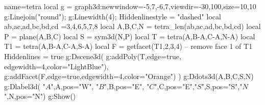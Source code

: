 \begin{luadraw}{name=tetra}
local g = graph3d:new{window={-5,7,-6,7},viewdir={-30,100},size={10,10}}
g:Linejoin("round"); g:Linewidth(4); Hiddenlinestyle = "dashed"
local ab,ac,ad,bc,bd,cd =3,4,6,5,7,8
local A,B,C,N = tetra_len(ab,ac,ad,bc,bd,cd) 
local P = plane(A,B,C)
local S = sym3d(N,P)
local T = tetra(A,B-A,C-A,N-A)
local T1 = tetra(A,B-A,C-A,S-A)
local F = getfacet(T1,{2,3,4}) -- remove face 1 of T1
Hiddenlines = true
g:Dscene3d(
 g:addPoly(T,{edge=true, edgewidth=4,color="LightBlue"}),
 g:addFacet(F,{edge=true,edgewidth=4,color="Orange"})
    )
g:Ddots3d({A,B,C,S,N})
g:Dlabel3d( "$A$",A,{pos="W"}, "$B$",B,{pos="E"}, "$C$",C,{pos="E"},"$S$",S,{pos="S"},"$N$",N,{pos="N"})
g:Show()
\end{luadraw} 
